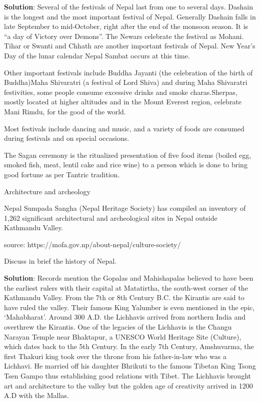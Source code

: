 \documentclass[
]{book}
\newcommand{\question}{\item}
\newenvironment{solution}{ {\bfseries Solution}:}{}
\begin{document}
\begin{questions}
\begin{solution}
Several of the festivals of Nepal last from one to several days. Dashain is the longest and the most important festival of Nepal. Generally Dashain falls in late September to mid-October, right after the end of the monsoon season. It is “a day of Victory over Demons”. The Newars celebrate the festival as Mohani. Tihar or Swanti and Chhath are another important festivals of Nepal. New Year’s Day of the lunar calendar Nepal Sambat occurs at this time.

Other important festivals include Buddha Jayanti (the celebration of the birth of Buddha)Maha Shivaratri (a festival of Lord Shiva) and during Maha Shivaratri festivities, some people consume excessive drinks and smoke charas.Sherpas, mostly located at higher altitudes and in the Mount Everest region, celebrate Mani Rimdu, for the good of the world.

Most festivals include dancing and music, and a variety of foods are consumed during festivals and on special occasions.

The Sagan ceremony is the ritualized presentation of five food items (boiled egg, smoked fish, meat, lentil cake and rice wine) to a person which is done to bring good fortune as per Tantric tradition.

Architecture and archeology

Nepal Sumpada Sangha (Nepal Heritage Society) has compiled an inventory of 1,262 significant architectural and archeological sites in Nepal outside Kathmandu Valley.

source: https://mofa.gov.np/about-nepal/culture-society/

\end{solution}

\question Discuss in brief the history of Nepal.

\begin{solution}
Records mention the Gopalas and Mahishapalas believed to have been the earliest rulers with their capital at Matatirtha, the south-west corner of the Kathmandu Valley. From the 7th or 8th Century B.C. the Kirantis are said to have ruled the valley. Their famous King Yalumber is even mentioned in the epic, ‘Mahabharat’. Around 300 A.D. the Lichhavis arrived from northern India and overthrew the Kirantis. One of the legacies of the Lichhavis is the Changu Narayan Temple near Bhaktapur, a UNESCO World Heritage Site (Culture), which dates back to the 5th Century. In the early 7th Century, Amshuvarma, the first Thakuri king took over the throne from his father-in-law who was a Lichhavi. He married off his daughter Bhrikuti to the famous Tibetan King Tsong Tsen Gampo thus establishing good relations with Tibet. The Lichhavis brought art and architecture to the valley but the golden age of creativity arrived in 1200 A.D with the Mallas.


\end{solution}
\end{questions}
\end{document}
